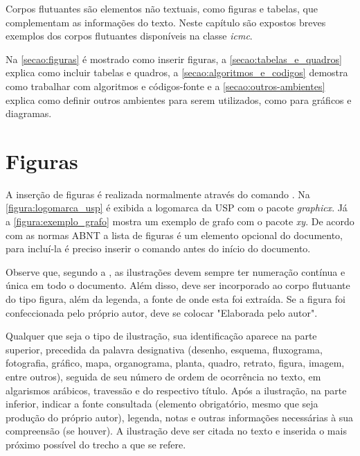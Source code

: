 
Corpos flutuantes são elementos não textuais, como figuras e tabelas, que complementam as informações do texto. Neste capítulo são expostos breves exemplos dos corpos flutuantes disponíveis na classe \textit{icmc}.

Na \autoref{secao:figuras} é mostrado como inserir figuras, a \autoref{secao:tabelas_e_quadros} explica como incluir tabelas e quadros, a \autoref{secao:algoritmos_e_codigos} demostra como trabalhar com algoritmos e códigos-fonte e a \autoref{secao:outros-ambientes} explica como definir outros ambientes para serem utilizados, como para gráficos e diagramas.

\section{Figuras}
\label{secao:figuras}

A inserção de figuras é realizada normalmente através do comando . Na \autoref{figura:logomarca_usp} é exibida a logomarca da USP com o pacote \textit{graphicx}. Já a \autoref{figura:exemplo_grafo} mostra um exemplo de grafo com o pacote \textit{xy}. De acordo com as normas ABNT a lista de figuras é um elemento opcional do documento, para incluí-la é preciso inserir o comando  antes do início do documento.

Observe que, segundo a , as
ilustrações devem sempre ter numeração contínua e única em todo o documento. Além disso, deve ser incorporado ao corpo flutuante do tipo figura, além da legenda, a fonte de onde esta foi extraída. Se a figura foi confeccionada pelo próprio autor, deve se colocar "Elaborada pelo autor".

\begin{citacao}
Qualquer que seja o tipo de ilustração, sua identificação aparece na parte
superior, precedida da palavra designativa (desenho, esquema, fluxograma,
fotografia, gráfico, mapa, organograma, planta, quadro, retrato, figura,
imagem, entre outros), seguida de seu número de ordem de ocorrência no texto,
em algarismos arábicos, travessão e do respectivo título. Após a ilustração, na
parte inferior, indicar a fonte consultada (elemento obrigatório, mesmo que
seja produção do próprio autor), legenda, notas e outras informações
necessárias à sua compreensão (se houver). A ilustração deve ser citada no
texto e inserida o mais próximo possível do trecho a que se
refere. \cite[seções 5.8]{NBR14724:2011}
\end{citacao}

